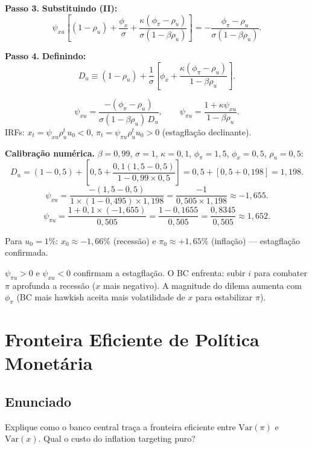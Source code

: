 \documentclass[12pt, a4paper]{article}
\begin{document}
\textbf{Passo 3.} \textbf{Substituindo (II):}
\[
\psi_{xu}\!\left[(1-\rho_u) + \frac{\phi_x}{\sigma}
  + \frac{\kappa(\phi_\pi-\rho_u)}{\sigma(1-\beta\rho_u)}\right]
= -\frac{\phi_\pi-\rho_u}{\sigma(1-\beta\rho_u)}.
\]

\textbf{Passo 4.} \textbf{Definindo:}
\[
D_u \equiv (1-\rho_u) + \frac{1}{\sigma}\!\left[\phi_x
  + \frac{\kappa(\phi_\pi-\rho_u)}{1-\beta\rho_u}\right].
\]

\begin{resultbox}[title={Solução analítica para choque de custo-push (Q10)}]
\[
\boxed{
\psi_{xu} = \frac{-(\phi_\pi-\rho_u)}{\sigma(1-\beta\rho_u)\,D_u},\qquad
\psi_{\pi u} = \frac{1+\kappa\psi_{xu}}{1-\beta\rho_u}.
}
\]
IRFs: $x_t = \psi_{xu}\rho_u^t u_0 < 0$, $\pi_t = \psi_{\pi u}\rho_u^t u_0 > 0$
(estagflação declinante).
\end{resultbox}

\textbf{Calibração numérica.}
$\beta=0{,}99$, $\sigma=1$, $\kappa=0{,}1$, $\phi_\pi=1{,}5$, $\phi_x=0{,}5$, $\rho_u=0{,}5$:
\[
D_u = (1-0{,}5) + \left[0{,}5 + \frac{0{,}1(1{,}5-0{,}5)}{1-0{,}99\times0{,}5}\right]
= 0{,}5 + [0{,}5 + 0{,}198] = 1{,}198.
\]
\[
\psi_{xu} = \frac{-(1{,}5-0{,}5)}{1\times(1-0{,}495)\times1{,}198}
= \frac{-1}{0{,}505\times1{,}198} \approx -1{,}655.
\]
\[
\psi_{\pi u} = \frac{1 + 0{,}1\times(-1{,}655)}{0{,}505}
= \frac{1 - 0{,}1655}{0{,}505} = \frac{0{,}8345}{0{,}505} \approx 1{,}652.
\]

Para $u_0 = 1\%$: $x_0 \approx -1{,}66\%$ (recessão) e $\pi_0 \approx +1{,}65\%$
(inflação) --- estagflação confirmada.

\begin{provabox}[title={Dilema da PM após custo-push (Q10)}]
$\psi_{\pi u} > 0$ e $\psi_{xu} < 0$ confirmam a estagflação. O BC enfrenta:
subir $i$ para combater $\pi$ aprofunda a recessão ($x$ mais negativo).
A magnitude do dilema aumenta com $\phi_\pi$ (BC mais hawkish aceita mais
volatilidade de $x$ para estabilizar $\pi$).
\end{provabox}

\section{Fronteira Eficiente de Política Monetária}

\subsection*{Enunciado}
Explique como o banco central traça a fronteira eficiente entre $\text{Var}(\pi)$ e
$\text{Var}(x)$. Qual o custo do inflation targeting puro?
\end{document}
